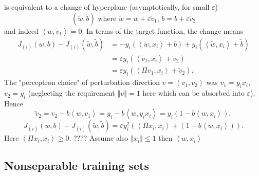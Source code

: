 \documentclass[11pt,twoside]{article}%
\theoremstyle{change}
\newenvironment{quote-env}{\begin{quote}\sffamily }{\end{quote}}
\newenvironment{mycomments-env}[1][Mycomments]{\textbf{#1.} \begin{quote-env} }{ \end{quote-env}  \ \rule{0.5em}{0.5em}}
\begin{document}
\begin{mycomments}
\begin{mycomments-env}
is equivalent to a change of hyperplane (asymptotically, for small
$\varepsilon$)%
\[
\left(  \tilde{w},\tilde{b}\right)  \text{ where }\tilde{w}=w+\varepsilon
\tilde{v}_{1}\text{, }\tilde{b}=b+\varepsilon\tilde{v}_{2}%
\]
and indeed $\left\langle w,\tilde{v}_{1}\right\rangle =0$. In terms of the
target function, the change means
\begin{align*}
J_{(i)}(w,b)-J_{(i)}(\tilde{w},\tilde{b})  & =-y_{i}\left(  \left\langle
w,x_{i}\right\rangle +b\right)  +y_{i}\left(  \left\langle \tilde{w}%
,x_{i}\right\rangle +\tilde{b}\right) \\
& =\varepsilon y_{i}\left(  \left\langle \tilde{v}_{1},x_{i}\right\rangle
+\tilde{v}_{2}\right) \\
& =\varepsilon y_{i}\left(  \left\langle \Pi v_{1},x_{i}\right\rangle
+\tilde{v}_{2}\right)  .
\end{align*}
The "perceptron choice" of perturbation direction $v=(v_{1},v_{2})$ was
$v_{1}=y_{i}x_{i}$, $v_{2}=y_{i}$ (neglecting the requirement $\left\Vert
v\right\Vert =1$ here which can be absorbed into $\varepsilon$). Hence%
\[
\tilde{v}_{2}=v_{2}-b\left\langle w,v_{1}\right\rangle =y_{i}-b\left\langle
w,y_{i}x_{i}\right\rangle =y_{i}\left(  1-b\left\langle w,x_{i}\right\rangle
\right)  ,
\]%
\[
J_{(i)}(w,b)-J_{(i)}(\tilde{w},\tilde{b})=\varepsilon y_{i}^{2}\left(
\left\langle \Pi x_{i},x_{i}\right\rangle +\left(  1-b\left\langle
w,x_{i}\right\rangle \right)  \right)  .
\]
Here $\left\langle \Pi x_{i},x_{i}\right\rangle \geq0.$ ???? Assume also
$\left\Vert x_{i}\right\Vert \leq1$ then $\left\langle w,x_{i}\right\rangle $
\end{mycomments-env}%

\end{mycomments}%


\subsection{Nonseparable training sets}
\end{document}
